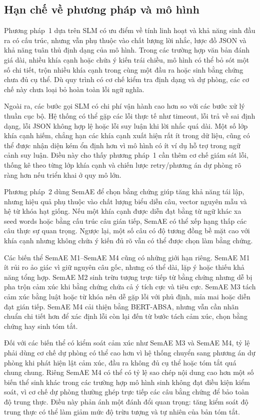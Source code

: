 \subsection{Hạn chế về phương pháp và mô hình}

Phương pháp~1 dựa trên SLM có ưu điểm về tính linh hoạt và khả năng sinh đầu ra có cấu trúc, nhưng vẫn phụ thuộc vào chất lượng lời nhắc, lược đồ JSON và khả năng tuân thủ định dạng của mô hình. Trong các trường hợp văn bản đánh giá dài, nhiều khía cạnh hoặc chứa ý kiến trái chiều, mô hình có thể bỏ sót một số chi tiết, trộn nhiều khía cạnh trong cùng một đầu ra hoặc sinh bằng chứng chưa đủ cụ thể. Dù quy trình có cơ chế kiểm tra định dạng và dự phòng, các cơ chế này chưa loại bỏ hoàn toàn lỗi ngữ nghĩa.

Ngoài ra, các bước gọi SLM có chi phí vận hành cao hơn so với các bước xử lý thuần cục bộ. Hệ thống có thể gặp các lỗi thực tế như timeout, lỗi trả về sai định dạng, lỗi JSON không hợp lệ hoặc lỗi suy luận khi lời nhắc quá dài. Một số lớp khía cạnh hiếm, chẳng hạn các khía cạnh xuất hiện rất ít trong dữ liệu, cũng có thể được nhận diện kém ổn định hơn vì mô hình có ít ví dụ hỗ trợ trong ngữ cảnh suy luận. Điều này cho thấy phương pháp~1 cần thêm cơ chế giám sát lỗi, thống kê theo từng lớp khía cạnh và chiến lược retry/phương án dự phòng rõ ràng hơn nếu triển khai ở quy mô lớn.

Phương pháp~2 dùng SemAE để chọn bằng chứng giúp tăng khả năng tái lập, nhưng hiệu quả phụ thuộc vào chất lượng biểu diễn câu, vector nguyên mẫu và hệ từ khóa hạt giống. Nếu một khía cạnh được diễn đạt bằng từ ngữ khác xa seed words hoặc bằng cấu trúc câu gián tiếp, SemAE có thể xếp hạng thấp các câu thực sự quan trọng. Ngược lại, một số câu có độ tương đồng bề mặt cao với khía cạnh nhưng không chứa ý kiến đủ rõ vẫn có thể được chọn làm bằng chứng.

Các biến thể SemAE M1--SemAE M4 cũng có những giới hạn riêng. SemAE M1 ít rủi ro ảo giác vì giữ nguyên câu gốc, nhưng có thể dài, lặp ý hoặc thiếu khả năng tổng hợp. SemAE M2 sinh trừu tượng trực tiếp từ bằng chứng nhưng dễ bị pha trộn cảm xúc khi bằng chứng chứa cả ý tích cực và tiêu cực. SemAE M3 tách cảm xúc bằng luật hoặc từ khóa nên dễ gặp lỗi với phủ định, mỉa mai hoặc diễn đạt gián tiếp. SemAE M4 cải thiện bằng BERT-ABSA, nhưng vẫn cần nhãn chuẩn chi tiết hơn để xác định lỗi còn lại đến từ bước tách cảm xúc, chọn bằng chứng hay sinh tóm tắt.

Đối với các biến thể có kiểm soát cảm xúc như SemAE M3 và SemAE M4, tỷ lệ phải dùng cơ chế dự phòng có thể cao hơn vì hệ thống chuyển sang phương án dự phòng khi phát hiện lật cảm xúc, đầu ra không đủ cụ thể hoặc tóm tắt quá chung chung. Riêng SemAE M4 có thể có tỷ lệ sao chép nội dung cao hơn một số biến thể sinh khác trong các trường hợp mô hình sinh không đạt điều kiện kiểm soát, vì cơ chế dự phòng thường ghép trực tiếp các câu bằng chứng để bảo toàn độ trung thực. Điều này phản ánh một đánh đổi quan trọng: tăng kiểm soát độ trung thực có thể làm giảm mức độ trừu tượng và tự nhiên của bản tóm tắt.

